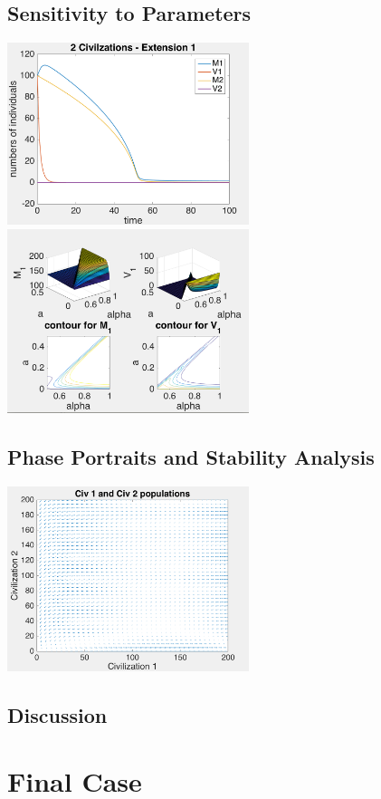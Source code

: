 \documentclass[12pt]{article}
\begin{document}
\subsection{Sensitivity to Parameters}

\includegraphics[width=200pt]{examplesim1}
\includegraphics[width=200pt]{examplecontour1}

\subsection{Phase Portraits and Stability Analysis}
\includegraphics[width=200pt]{phase2}

\subsection{Discussion}

\section{Final Case} 
\end{document}
